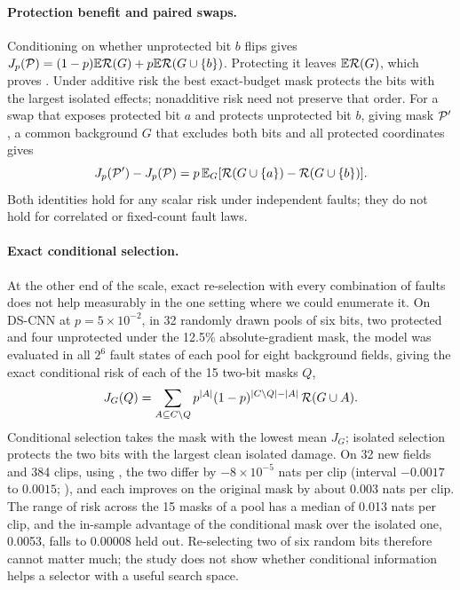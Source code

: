 \paragraph{Protection benefit and paired swaps.} Conditioning on whether unprotected bit $b$ flips gives $J_p(\mathcal{P})=(1-p)\mathbb{E}\mathcal{R}(G)+p\mathbb{E}\mathcal{R}(G\cup\{b\})$. Protecting it leaves $\mathbb{E}\mathcal{R}(G)$, which proves . Under additive risk the best exact-budget mask protects the bits with the largest isolated effects; nonadditive risk need not preserve that order. For a swap that exposes protected bit $a$ and protects unprotected bit $b$, giving mask $\mathcal{P}'$, a common background $G$ that excludes both bits and all protected coordinates gives
\begin{equation}\label{eq:swap}
J_p(\mathcal{P}')-J_p(\mathcal{P})=p\,\mathbb{E}_G[\mathcal{R}(G\cup\{a\})-\mathcal{R}(G\cup\{b\})].
\end{equation}
Both identities hold for any scalar risk under independent faults; they do not hold for correlated or fixed-count fault laws.

\paragraph{Exact conditional selection.} At the other end of the scale, exact re-selection with every combination of faults does not help measurably in the one setting where we could enumerate it. On DS-CNN at $p=5\times10^{-2}$, in 32 randomly drawn pools of six bits, two protected and four unprotected under the 12.5\% absolute-gradient mask, the model was evaluated in all $2^6$ fault states of each pool for eight background fields, giving the exact conditional risk of each of the 15 two-bit masks $Q$,
\begin{equation}\label{eq:response-table}
J_G(Q)=\sum_{A\subseteq C\setminus Q}p^{|A|}(1-p)^{|C\setminus Q|-|A|}\,\mathcal{R}(G\cup A).
\end{equation}
Conditional selection takes the mask with the lowest mean $J_G$; isolated selection protects the two bits with the largest clean isolated damage. On 32 new fields and 384 clips, using , the two differ by $-8\times10^{-5}$ nats per clip (interval $-0.0017$ to $0.0015$; ), and each improves on the original mask by about $0.003$ nats per clip. The range of risk across the 15 masks of a pool has a median of 0.013 nats per clip, and the in-sample advantage of the conditional mask over the isolated one, 0.0053, falls to 0.00008 held out. Re-selecting two of six random bits therefore cannot matter much; the study does not show whether conditional information helps a selector with a useful search space.

